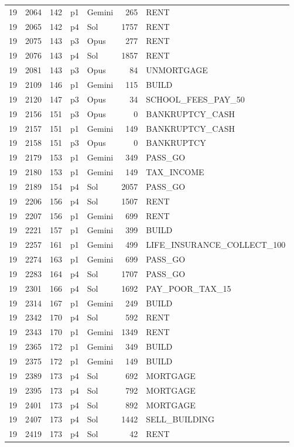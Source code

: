 \begin{longtable}{r r r l l r L{2.2in}}
19 & 2064 & 142 & p1 & Gemini & 265 & RENT \\
19 & 2065 & 142 & p4 & Sol & 1757 & RENT \\
19 & 2075 & 143 & p3 & Opus & 277 & RENT \\
19 & 2076 & 143 & p4 & Sol & 1857 & RENT \\
19 & 2081 & 143 & p3 & Opus & 84 & UNMORTGAGE \\
19 & 2109 & 146 & p1 & Gemini & 115 & BUILD \\
19 & 2120 & 147 & p3 & Opus & 34 & SCHOOL\_FEES\_PAY\_50 \\
19 & 2156 & 151 & p3 & Opus & 0 & BANKRUPTCY\_CASH \\
19 & 2157 & 151 & p1 & Gemini & 149 & BANKRUPTCY\_CASH \\
19 & 2158 & 151 & p3 & Opus & 0 & BANKRUPTCY \\
19 & 2179 & 153 & p1 & Gemini & 349 & PASS\_GO \\
19 & 2180 & 153 & p1 & Gemini & 149 & TAX\_INCOME \\
19 & 2189 & 154 & p4 & Sol & 2057 & PASS\_GO \\
19 & 2206 & 156 & p4 & Sol & 1507 & RENT \\
19 & 2207 & 156 & p1 & Gemini & 699 & RENT \\
19 & 2221 & 157 & p1 & Gemini & 399 & BUILD \\
19 & 2257 & 161 & p1 & Gemini & 499 & LIFE\_INSURANCE\_COLLECT\_100 \\
19 & 2274 & 163 & p1 & Gemini & 699 & PASS\_GO \\
19 & 2283 & 164 & p4 & Sol & 1707 & PASS\_GO \\
19 & 2301 & 166 & p4 & Sol & 1692 & PAY\_POOR\_TAX\_15 \\
19 & 2314 & 167 & p1 & Gemini & 249 & BUILD \\
19 & 2342 & 170 & p4 & Sol & 592 & RENT \\
19 & 2343 & 170 & p1 & Gemini & 1349 & RENT \\
19 & 2365 & 172 & p1 & Gemini & 349 & BUILD \\
19 & 2375 & 172 & p1 & Gemini & 149 & BUILD \\
19 & 2389 & 173 & p4 & Sol & 692 & MORTGAGE \\
19 & 2395 & 173 & p4 & Sol & 792 & MORTGAGE \\
19 & 2401 & 173 & p4 & Sol & 892 & MORTGAGE \\
19 & 2407 & 173 & p4 & Sol & 1442 & SELL\_BUILDING \\
19 & 2419 & 173 & p4 & Sol & 42 & RENT \\

\end{longtable}
